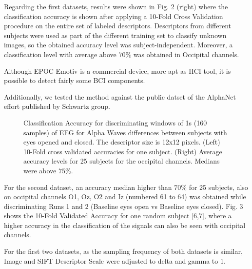 Regarding the first datasets, results were shown in Fig. 2 (right) where the classification accuracy is shown after applying a 10-Fold Cross Validation procedure on the entire set of labeled descriptors.  Descriptors from different subjects were used as part of the different training set to classify unknown images, so the obtained accuracy level was subject-independent.  Moreover, a classification level with average above $70\%$ was obtained in Occipital channels.
   
Although EPOC Emotiv is a commercial device, more apt as HCI tool, it is possible to detect fairly some BCI components.
      
Additionally, we tested the method against the public datset of the AlphaNet effort published by Schwartz group.

  \begin{figure}[thpb]
      \centering
      \setlength\fboxsep{0pt}
	  \setlength\fboxrule{0.5pt}
      \caption{Classification Accuracy for discriminating windows of 1s (160 samples) of EEG for Alpha Waves differences between subjects with eyes opened and closed. The descriptor size is 12x12 pixels. (Left) 10-Fold cross validated accuracies for one subject.  (Right) Average accuracy levels for 25 subjects for the occipital channels. Medians were above $75\%$.}
      \label{figure1}
   \end{figure}   

For the second dataset, an accuracy median higher than $70\%$ for 25 subjects, also on occipital channels O1, Oz, O2 and Iz (numbered 61 to 64) was obtained while discriminating Runs 1 and 2 (Baseline eyes open vs Baseline eyes closed). Fig. 3 shows the 10-Fold Validated Accuracy for one random subject [6,7], where a higher accuracy in the classification of the signals can also be seen with occipital channels.  

For the first two datasets, as the sampling frequency of both datasets is similar, Image and SIFT Descriptor Scale were adjusted to delta and gamma to 1.

